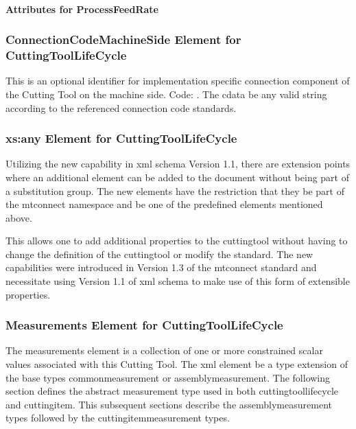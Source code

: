 \paragraph{Attributes for ProcessFeedRate}\mbox{}




\subsubsection{ConnectionCodeMachineSide Element for CuttingToolLifeCycle}

This is an optional identifier for implementation specific connection component of the Cutting Tool on the machine side.  Code: .  The \gls{cdata} \MAY be any valid string according to the referenced connection code standards.

\subsubsection{xs:any Element for CuttingToolLifeCycle}

Utilizing the new capability in \gls{xml schema} Version 1.1, there are extension points where an additional element can be added to the document without being part of a substitution group.  The new elements have the restriction that they \MUSTNOT be part of the \gls{mtconnect} \gls{namespace} and \MUSTNOT be one of the predefined elements mentioned above.

This allows one to add additional properties to the \gls{cuttingtool} without having to change the definition of the \gls{cuttingtool} or modify the standard. The new capabilities were introduced in Version 1.3 of the \gls{mtconnect standard} and necessitate using Version 1.1 of \gls{xml schema} to make use of this form of extensible properties. 

\subsubsection{Measurements Element for CuttingToolLifeCycle}

The \glspl{measurement} element is a collection of one or more constrained scalar values associated with this Cutting Tool.  The \gls{xml} element \MUST be a type extension of the base types \gls{commonmeasurement} or \gls{assemblymeasurement}.  The following section defines the abstract \gls{measurement} type used in both \gls{cuttingtoollifecycle} and \gls{cuttingitem}.  This subsequent sections describe the \gls{assemblymeasurement} types followed by the \gls{cuttingitemmeasurement} types.

